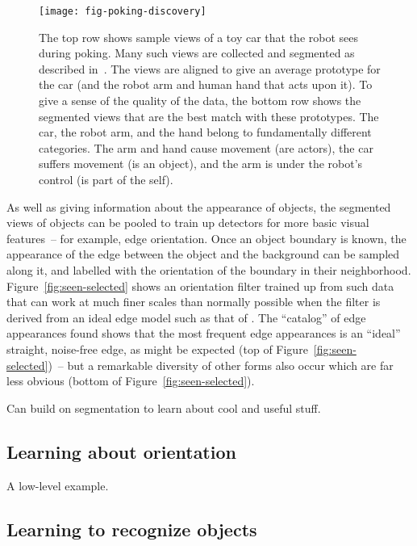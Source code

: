 \begin{figure}[tb]
  \centerline{\texttt{[image: fig-poking-discovery]}}
  \caption[How poking gets used]{
\label{fig:clean-vision}
%
The top row shows sample views of a toy car that the robot sees during
poking.  Many such views are collected and segmented as described
in~\protect\cite[]{fitzpatrick03first}.  The views are aligned to give an
average prototype for the car (and the robot arm and human hand that
acts upon it).  To give a sense of the quality of the data, the bottom
row shows the segmented views that are the best match with these
prototypes.  The car, the robot arm, and the hand belong to
fundamentally different categories.  The arm and hand cause movement
(are actors), the car suffers movement (is an object), and the arm
is under the robot's control (is part of the self).
%
}
\end{figure}

As well as giving information about the appearance of objects, the
segmented views of objects can be pooled to train up detectors for
more basic visual features~-- for example, edge orientation.  Once an
object boundary is known, the appearance of the edge between the
object and the background can be sampled along it, and labelled with
the orientation of the boundary in their neighborhood.
Figure~\ref{fig:seen-selected} shows an orientation filter trained up
from such data that can work at much finer scales than normally
possible when the filter is derived from an ideal edge model such as
that of \cite[]{chen00orientation}.  The ``catalog'' of edge appearances
found shows that the most frequent edge appearances is an ``ideal''
straight, noise-free edge, as might be expected (top of
Figure~\ref{fig:seen-selected})~-- but a remarkable diversity of other
forms also occur which are far less obvious (bottom of
Figure~\ref{fig:seen-selected}).

Can build on segmentation to learn about cool and useful stuff.

\subsection*{Learning about orientation}

A low-level example.

\subsection*{Learning to recognize objects}

